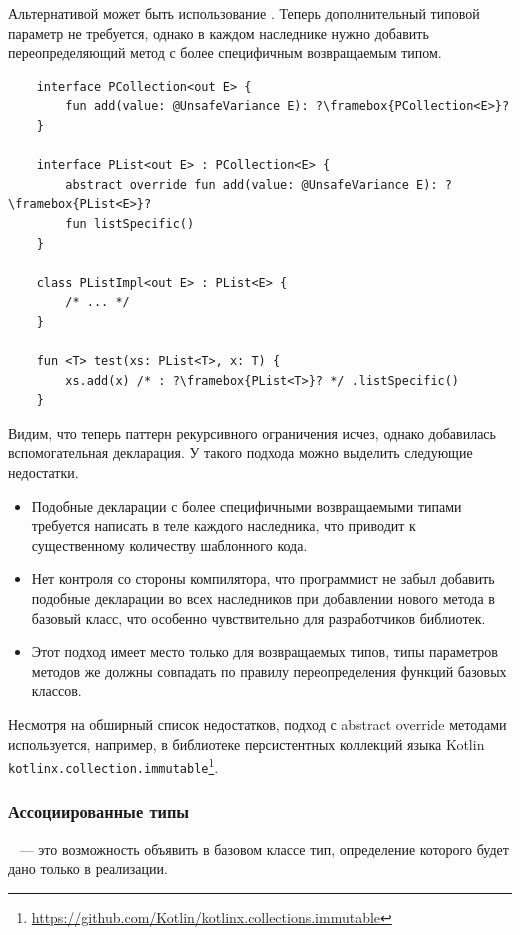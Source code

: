 Альтернативой может быть использование .
Теперь дополнительный типовой параметр не требуется, однако в каждом наследнике нужно добавить переопределяющий метод с более специфичным возвращаемым типом.

\begin{verbatim}
    interface PCollection<out E> {
        fun add(value: @UnsafeVariance E): ?\framebox{PCollection<E>}?
    }

    interface PList<out E> : PCollection<E> {
        abstract override fun add(value: @UnsafeVariance E): ?\framebox{PList<E>}?
        fun listSpecific()
    }

    class PListImpl<out E> : PList<E> {
        /* ... */
    }

    fun <T> test(xs: PList<T>, x: T) {
        xs.add(x) /* : ?\framebox{PList<T>}? */ .listSpecific()
    }
\end{verbatim}

Видим, что теперь паттерн рекурсивного ограничения исчез, однако добавилась вспомогательная декларация.
У такого подхода можно выделить следующие недостатки.

\begin{itemize}
    \item Подобные декларации с более специфичными возвращаемыми типами требуется написать в теле каждого наследника, что приводит к существенному количеству шаблонного кода.
    \item Нет контроля со стороны компилятора, что программист не забыл добавить подобные декларации во всех наследников при добавлении нового метода в базовый класс, что особенно чувствительно для разработчиков библиотек.
    \item Этот подход имеет место только для возвращаемых типов, типы параметров методов же должны совпадать по правилу переопределения функций базовых классов.
\end{itemize}

Несмотря на обширный список недостатков, подход с abstract override методами используется, например, в библиотеке персистентных коллекций языка Kotlin \texttt{kotlinx.collection.immutable}\footnote{\url{https://github.com/Kotlin/kotlinx.collections.immutable}}.

\subsubsection{Ассоциированные типы}

\begin{definition}
    \label{def:assoc}
    ~\cite{chakravarty2005associated} --- это возможность объявить в базовом классе тип, определение которого будет дано только в реализации.
\end{definition}

